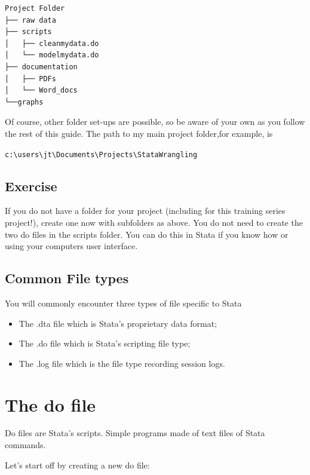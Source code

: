 \documentclass[
]{article}
\providecommand{\tightlist}{%
  \setlength{\itemsep}{0pt}\setlength{\parskip}{0pt}}
\begin{document}
\begin{verbatim}
Project Folder
├── raw data
├── scripts
│   ├── cleanmydata.do
│   └── modelmydata.do
├── documentation
│   ├── PDFs
│   └── Word_docs
└──graphs
\end{verbatim}

Of course, other folder set-ups are possible, so be aware of your own as you follow the rest of this guide. The path to my main project folder,for example, is

\texttt{c:\textbackslash{}users\textbackslash{}jt\textbackslash{}Documents\textbackslash{}Projects\textbackslash{}StataWrangling}

\hypertarget{exercise}{%
\subsection{Exercise}\label{exercise}}

If you do not have a folder for your project (including for this training series project!), create one now with subfolders as above. You do not need to create the two do files in the scripts folder. You can do this in Stata if you know how or using your computers user interface.

\hypertarget{common-file-types}{%
\subsection{Common File types}\label{common-file-types}}

You will commonly encounter three types of file specific to Stata

\begin{itemize}
\tightlist
\item
  The .dta file which is Stata's proprietary data format;
\item
  The .do file which is Stata's scripting file type;
\item
  The .log file which is the file type recording session logs.
\end{itemize}

\hypertarget{the-do-file}{%
\section{The do file}\label{the-do-file}}

Do files are Stata's scripts. Simple programs made of text files of Stata commands.

Let's start off by creating a new do file:
\end{document}

